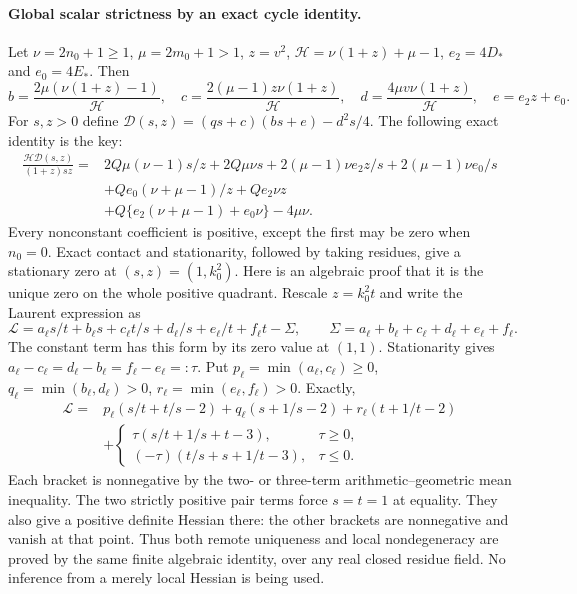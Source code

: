\paragraph{Global scalar strictness by an exact cycle identity.}
Let $\nu=2n_0+1\geq1$, $\mu=2m_0+1>1$, $z=v^2$,
$\mathcal H=\nu(1+z)+\mu-1$, $e_2=4D_*$ and $e_0=4E_*$.  Then
\[
 b=\frac{2\mu(\nu(1+z)-1)}{\mathcal H},\quad
 c=\frac{2(\mu-1)z\nu(1+z)}{\mathcal H},\quad
 d=\frac{4\mu v\nu(1+z)}{\mathcal H},\quad
 e=e_2z+e_0.
\]
For $s,z>0$ define
$\mathcal D(s,z)=(q s+c)(b s+e)-d^2s/4$.
The following exact identity is the key:
\begin{align*}
 \frac{\mathcal H\mathcal D(s,z)}{(1+z)sz}
 ={}&2Q\mu(\nu-1)s/z+2Q\mu\nu s
 +2(\mu-1)\nu e_2z/s+2(\mu-1)\nu e_0/s\\
 &+Qe_0(\nu+\mu-1)/z+Qe_2\nu z\\
 &+Q\{e_2(\nu+\mu-1)+e_0\nu\}-4\mu\nu.
\end{align*}
Every nonconstant coefficient is positive, except the first may be
zero when $n_0=0$.  Exact contact and stationarity, followed by taking
residues, give a stationary zero at $(s,z)=(1,k_0^2)$.  Here is an
algebraic proof that it is the unique zero on the whole positive
quadrant.  Rescale $z=k_0^2t$ and write the Laurent expression as
\[
 \mathcal L=a_\ell s/t+b_\ell s+c_\ell t/s+d_\ell/s
                      +e_\ell/t+f_\ell t-\Sigma,
 \qquad \Sigma=a_\ell+b_\ell+c_\ell+d_\ell+e_\ell+f_\ell.
\]
The constant term has this form by its zero value at $(1,1)$.
Stationarity gives
$a_\ell-c_\ell=d_\ell-b_\ell=f_\ell-e_\ell=:\tau$.
Put $p_\ell=\min(a_\ell,c_\ell)\geq0$,
$q_\ell=\min(b_\ell,d_\ell)>0$,
$r_\ell=\min(e_\ell,f_\ell)>0$.  Exactly,
\begin{align*}
 \mathcal L={}&p_\ell(s/t+t/s-2)+q_\ell(s+1/s-2)
                              +r_\ell(t+1/t-2)\\
 &+\begin{cases}
 \tau(s/t+1/s+t-3),&\tau\geq0,\\
 (-\tau)(t/s+s+1/t-3),&\tau\leq0.
 \end{cases}
\end{align*}
Each bracket is nonnegative by the two- or three-term
arithmetic--geometric mean inequality.  The two strictly positive
pair terms force $s=t=1$ at equality.  They also give a positive
definite Hessian there: the other brackets are nonnegative and
vanish at that point.  Thus both remote uniqueness and local
nondegeneracy are proved by the same finite algebraic identity, over
any real closed residue field.  No inference from a merely local
Hessian is being used.

